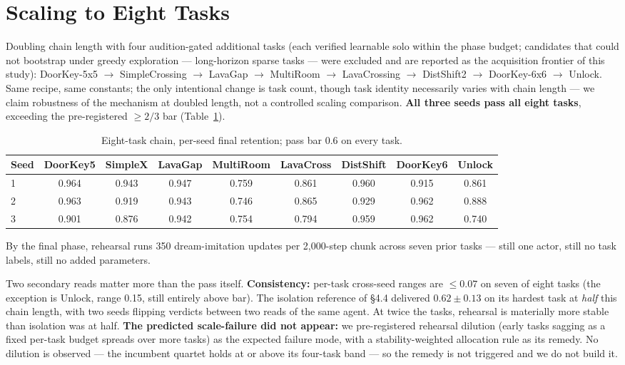\documentclass[10pt]{article}
\begin{document}
\section{Scaling to Eight Tasks}

Doubling chain length with four audition-gated additional tasks (each verified learnable
solo within the phase budget; candidates that could not bootstrap under greedy exploration
--- long-horizon sparse tasks --- were excluded and are reported as the acquisition frontier
of this study): DoorKey-5x5 $\rightarrow$ SimpleCrossing $\rightarrow$ LavaGap
$\rightarrow$ MultiRoom $\rightarrow$ LavaCrossing $\rightarrow$ DistShift2 $\rightarrow$
DoorKey-6x6 $\rightarrow$ Unlock. Same recipe, same constants; the only intentional change is task
count, though task identity necessarily varies with chain length --- we claim robustness of
the mechanism at doubled length, not a controlled scaling comparison. \textbf{All three seeds pass all eight tasks}, exceeding the pre-registered
${\geq}2/3$ bar (Table~\ref{tab:eight}).

\begin{table}[h]
\centering
\small
\setlength{\tabcolsep}{4.5pt}
\begin{tabular}{lcccccccc}
\toprule
Seed & DoorKey5 & SimpleX & LavaGap & MultiRoom & LavaCross & DistShift & DoorKey6 & Unlock \\
\midrule
1 & 0.964 & 0.943 & 0.947 & 0.759 & 0.861 & 0.960 & 0.915 & 0.861 \\
2 & 0.963 & 0.919 & 0.943 & 0.746 & 0.865 & 0.929 & 0.962 & 0.888 \\
3 & 0.901 & 0.876 & 0.942 & 0.754 & 0.794 & 0.959 & 0.962 & 0.740 \\
\bottomrule
\end{tabular}
\caption{Eight-task chain, per-seed final retention; pass bar 0.6 on every task.}
\label{tab:eight}
\end{table}

By the final phase, rehearsal runs 350 dream-imitation updates per 2{,}000-step chunk across
seven prior tasks --- still one actor, still no task labels, still no added parameters.

Two secondary reads matter more than the pass itself. \textbf{Consistency:} per-task
cross-seed ranges are ${\leq}0.07$ on seven of eight tasks (the exception is Unlock, range
0.15, still entirely above bar). The isolation reference of \S4.4 delivered
$0.62 \pm 0.13$ on its hardest task at \emph{half} this chain length, with two seeds
flipping verdicts between two reads of the same agent. At twice the tasks, rehearsal is
materially more stable than isolation was at half. \textbf{The predicted scale-failure did
not appear:} we pre-registered rehearsal dilution (early tasks sagging as a fixed per-task
budget spreads over more tasks) as the expected failure mode, with a stability-weighted
allocation rule as its remedy. No dilution is observed --- the incumbent quartet holds at or
above its four-task band --- so the remedy is not triggered and we do not build it.
\end{document}
